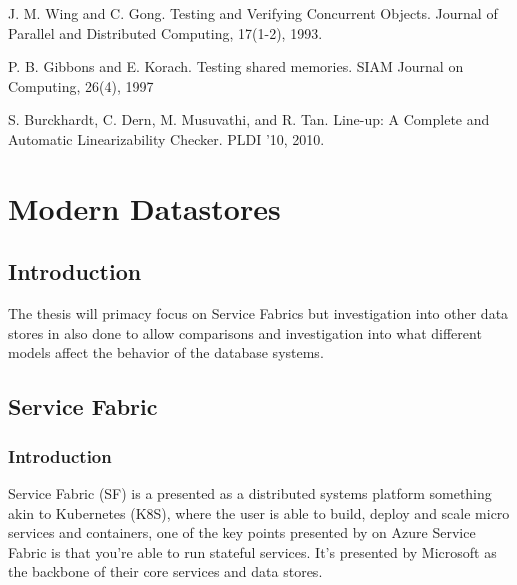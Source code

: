 \documentclass[a4paper,10pt,titlepage]{report}
\begin{document}
    J. M. Wing and C. Gong. Testing and Verifying
    Concurrent Objects. Journal of Parallel and
    Distributed Computing, 17(1-2), 1993.

    P. B. Gibbons and E. Korach. Testing shared
    memories. SIAM Journal on Computing, 26(4), 1997

    S. Burckhardt, C. Dern, M. Musuvathi, and R. Tan.
    Line-up: A Complete and Automatic Linearizability
    Checker. PLDI '10, 2010.







    \newpage


    \chapter{Modern Datastores}


    \section{Introduction}

    The thesis will primacy focus on Service Fabrics but investigation into other data stores in also done to allow comparisons and investigation into what different models affect the behavior of the database systems.


    \section{Service Fabric}

%

    \subsection{Introduction}

    Service Fabric (SF) is a presented as a distributed systems platform something akin to Kubernetes (K8S), where the user is able to build, deploy and scale micro services and containers, one of the key points presented by on Azure Service Fabric is that you're able to run stateful services. It's presented by Microsoft as the backbone of their core services and data stores.\\
    \vspace{5mm}
\end{document}
